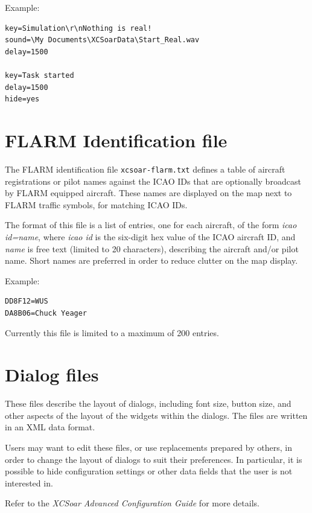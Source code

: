 \documentclass[a4paper,12pt]{refrep}
\begin{document}
Example:
\begin{verbatim}
key=Simulation\r\nNothing is real!
sound=\My Documents\XCSoarData\Start_Real.wav
delay=1500

key=Task started
delay=1500
hide=yes
\end{verbatim}
% 

\section{FLARM Identification file}\label{sec:flarm-ident-file}

The FLARM identification file \verb|xcsoar-flarm.txt| defines a table
of aircraft registrations or pilot names against the ICAO IDs that are
optionally broadcast by FLARM equipped aircraft.  These names are
displayed on the map next to FLARM traffic symbols, for matching ICAO
IDs.

The format of this file is a list of entries, one for each aircraft,
of the form {\em icao id=name}, where {\em icao id} is the six-digit
hex value of the ICAO aircraft ID, and {\em name} is free text
(limited to 20 characters), describing the aircraft and/or pilot name.
Short names are preferred in order to reduce clutter on the map
display.

Example:
\begin{verbatim}
DD8F12=WUS
DA8B06=Chuck Yeager
\end{verbatim}

Currently this file is limited to a maximum of 200 entries.

\section{Dialog files}\label{sec:dialog-files}

These files describe the layout of dialogs, including font size,
button size, and other aspects of the layout of the widgets within
the dialogs.  The files are written in an XML data format.

Users may want to edit these files, or use replacements prepared by
others, in order to change the layout of dialogs to suit their
preferences.  In particular, it is possible to hide configuration
settings or other data fields that the user is not interested in.

Refer to the {\em XCSoar Advanced Configuration Guide} for more details.

%
\end{document}

